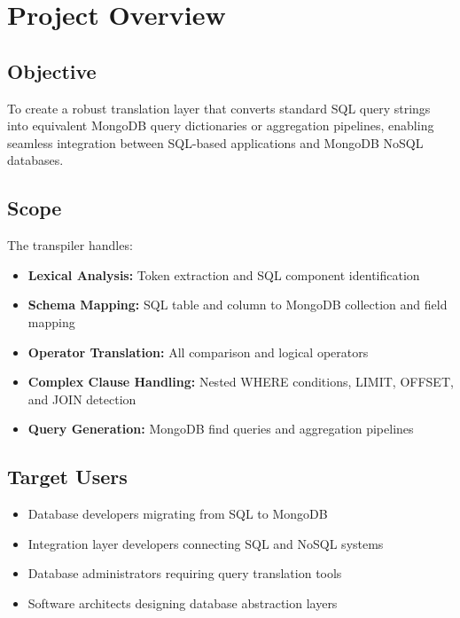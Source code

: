 \documentclass[12pt,a4paper]{article}
\begin{document}
\newpage

\section{Project Overview}

\subsection{Objective}
To create a robust translation layer that converts standard SQL query strings into equivalent MongoDB query dictionaries or aggregation pipelines, enabling seamless integration between SQL-based applications and MongoDB NoSQL databases.

\subsection{Scope}

The transpiler handles:
\begin{itemize}
    \item \textbf{Lexical Analysis:} Token extraction and SQL component identification
    \item \textbf{Schema Mapping:} SQL table and column to MongoDB collection and field mapping
    \item \textbf{Operator Translation:} All comparison and logical operators
    \item \textbf{Complex Clause Handling:} Nested WHERE conditions, LIMIT, OFFSET, and JOIN detection
    \item \textbf{Query Generation:} MongoDB find queries and aggregation pipelines
\end{itemize}

\subsection{Target Users}
\begin{itemize}
    \item Database developers migrating from SQL to MongoDB
    \item Integration layer developers connecting SQL and NoSQL systems
    \item Database administrators requiring query translation tools
    \item Software architects designing database abstraction layers
\end{itemize}

\newpage
\end{document}
